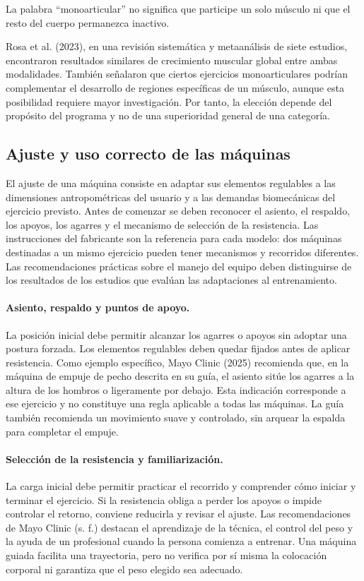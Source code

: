 La palabra \enquote{monoarticular} no significa que participe un solo músculo
ni que el resto del cuerpo permanezca inactivo.

Rosa et al. (2023), en una revisión sistemática y metaanálisis de siete
estudios, encontraron resultados similares de crecimiento muscular global entre
ambas modalidades. También señalaron que ciertos ejercicios monoarticulares
podrían complementar el desarrollo de regiones específicas de un músculo,
aunque esta posibilidad requiere mayor investigación. Por tanto, la elección
depende del propósito del programa y no de una superioridad general de una
categoría.

\subsection{Ajuste y uso correcto de las máquinas}
\label{subsec:ajuste-maquinas}

El ajuste de una máquina consiste en adaptar sus elementos regulables a las
dimensiones antropométricas del usuario y a las demandas biomecánicas del ejercicio previsto. Antes de comenzar se deben
reconocer el asiento, el respaldo, los apoyos, los agarres y el mecanismo de
selección de la resistencia. Las instrucciones del fabricante son la referencia
para cada modelo: dos máquinas destinadas a un mismo ejercicio pueden tener
mecanismos y recorridos diferentes. Las recomendaciones prácticas sobre el manejo
del equipo deben distinguirse de los resultados de los estudios que evalúan las adaptaciones al entrenamiento.

\paragraph{Asiento, respaldo y puntos de apoyo.}
La posición inicial debe permitir alcanzar los agarres o apoyos sin adoptar una postura forzada. Los elementos regulables deben quedar fijados antes de aplicar resistencia. Como ejemplo específico, Mayo Clinic (2025) recomienda que, en la máquina de empuje de pecho descrita en su guía, el asiento sitúe los agarres a la altura de los hombros o ligeramente por debajo. Esta indicación corresponde a ese ejercicio y no constituye una regla aplicable a todas las máquinas. La guía también recomienda un movimiento suave y controlado, sin arquear la espalda para completar el empuje.

\paragraph{Selección de la resistencia y familiarización.}
La carga inicial debe permitir practicar el recorrido y comprender cómo iniciar y terminar el ejercicio. Si la resistencia obliga a perder los apoyos o impide controlar el retorno, conviene reducirla y revisar el ajuste. Las recomendaciones de Mayo Clinic (s. f.) destacan el aprendizaje de la técnica, el control del peso y la ayuda de un profesional cuando la persona comienza a entrenar. Una máquina guiada facilita una trayectoria, pero no verifica por sí misma la colocación corporal ni garantiza que el peso elegido sea adecuado.

